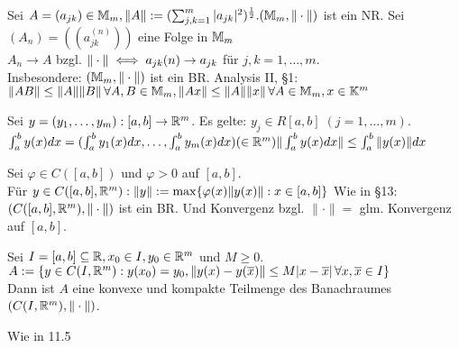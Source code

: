 \documentclass{article}
\begin{document}
\begin{definition}
Sei $A = (a_{jk}) \in \mathbb{M}_m , \|A\| := (\sum_{j,k =1}^{m} |a_{jk}|^2)^\frac{1}{2}. \\
(\mathbb{M}_m, \|\cdot\|)$ ist ein NR. Sei $(A_n) = ((a_{jk}^{(n)}))$ eine Folge in $\mathbb{M}_m$ \\
$A_n \rightarrow A$ bzgl. $\|\cdot\| \iff a_{jk}(n) \rightarrow a_{jk}$ für $j, k = 1,\ldots,m.$ \\
Insbesondere: $(\mathbb{M}_m, \|\cdot\|)$ ist ein BR.
Analysis II, §1: \\
$\|AB\| \leq \|A\| \|B\| \, \forall A, B \in \mathbb{M}_m, \|Ax\| \leq \|A\| \|x\| \, \forall A \in \mathbb{M}_m, x \in \mathbb{K}^m$
\end{definition}

\begin{erinnerung} [Analysis II, §12]
Sei $y = (y_1,\ldots, y_m): [a, b] \rightarrow \mathbb{R}^m$. Es gelte: $y_j \in R [a, b] \; (j = 1, \ldots, m)$. $\int_{a}^{b} y(x) dx = (\int_{a}^{b}y_1(x) dx, \ldots, \int_{a}^{b} y_m(x) dx) (\in \mathbb{R}^m) \\
\|\int_{a}^{b} y(x) dx\| \leq \int_{a}^{b} \|y(x)\| dx$
\end{erinnerung}

\begin{definition}
Sei $\varphi \in C([a, b])$ und $\varphi > 0$ auf $[a, b]$. \\ 
Für $y \in C([a, b], \mathbb{R}^m) : \|y\|:=\max\{\varphi(x) \|y(x)\|: x \in [a, b]\}$
Wie in §13:  $(C([a, b], \mathbb{R}^m), \|\cdot\|)$ ist ein BR. Und Konvergenz bzgl. $\|\cdot\| = $ glm. Konvergenz auf $[a, b]$.
\end{definition}

\begin{satz}
Sei $I = [a, b] \subseteq \mathbb{R}, x_0 \in I, y_0 \in \mathbb{R}^m$ und $M \geq 0$. \\
$A := \{y \in C(I, \mathbb{R}^m): y(x_0) = y_0, \|y(x)-y(\overline{x})\| \leq M|x - \overline{x}| \, \forall x, \overline{x} \in I\}$\\
Dann ist $A$ eine konvexe und kompakte Teilmenge des Banachraumes $(C(I,\mathbb{R}^m), \|\cdot\|)$.
\end{satz}

\begin{beweis}
Wie in 11.5
\end{beweis}
\end{document}
